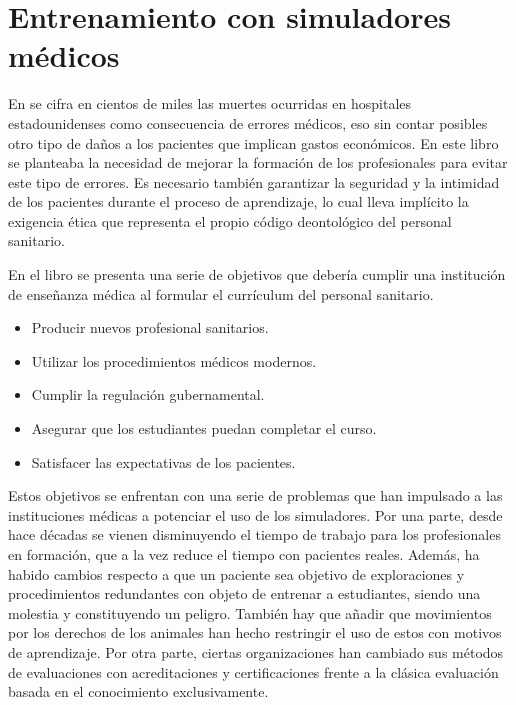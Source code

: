 \section{Entrenamiento con simuladores médicos}
\label{art:learning}



En \cite{donaldson2000err} se cifra en cientos de miles las muertes ocurridas en hospitales estadounidenses como consecuencia de errores médicos, eso sin contar posibles otro tipo de daños a los pacientes que implican gastos económicos. En este libro se planteaba la necesidad de mejorar la formación de los profesionales para evitar este tipo de errores. 
Es necesario también garantizar la seguridad y la intimidad de los pacientes durante el proceso de aprendizaje, lo cual lleva implícito la exigencia ética que representa el propio código deontológico del personal sanitario. 

En el libro \cite{dent2017practical} se presenta una serie de objetivos que debería cumplir una institución de enseñanza médica al formular el currículum del personal sanitario.
\begin{itemize}
    \item Producir nuevos profesional sanitarios.
    \item Utilizar los procedimientos médicos modernos.
    \item Cumplir la regulación gubernamental.
    \item Asegurar que los estudiantes puedan completar el curso.
    \item Satisfacer las expectativas de los pacientes.
\end{itemize}

Estos objetivos se enfrentan con una serie de problemas que han impulsado a las instituciones médicas a potenciar el uso de los simuladores.
Por una parte,  desde hace décadas se vienen disminuyendo el tiempo de trabajo para los profesionales en formación, que a la vez reduce el tiempo con pacientes reales. Además,  ha habido cambios respecto a que un paciente sea objetivo de exploraciones y procedimientos redundantes con objeto de entrenar a estudiantes, siendo una molestia y constituyendo un peligro. También hay que añadir que movimientos por los derechos de los animales han hecho restringir el uso de estos con motivos de aprendizaje. Por otra parte, ciertas organizaciones han cambiado sus métodos de evaluaciones con acreditaciones y certificaciones frente a la clásica evaluación basada en el conocimiento exclusivamente.

